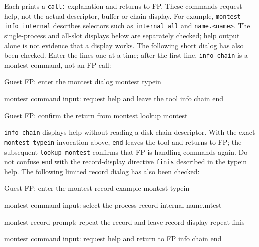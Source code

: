 Each prints a \passthrough{\lstinline!call:!} explanation and returns to FP. These commands request help, not the actual descriptor, buffer or chain display. For example, \passthrough{\lstinline!montest info internal!} describes selectors such as \passthrough{\lstinline!internal all!} and \passthrough{\lstinline!name.<name>!}. The single-process and all-slot displays below are separately checked; help output alone is not evidence that a display works. The following short dialog has also been checked. Enter the lines one at a time; after the first line, \passthrough{\lstinline!info chain!} is a montest command, not an FP call:

\begin{commandexample}{Guest FP: enter the montest dialog}
montest typein
\end{commandexample}

\begin{commandexample}{montest command input: request help and leave the tool}
info chain
end
\end{commandexample}

\begin{commandexample}{Guest FP: confirm the return from montest}
lookup montest
\end{commandexample}

\passthrough{\lstinline!info chain!} displays help without reading a disk-chain descriptor. With the exact \passthrough{\lstinline!montest typein!} invocation above, \passthrough{\lstinline!end!} leaves the tool and returns to FP; the subsequent \passthrough{\lstinline!lookup montest!} confirms that FP is handling commands again. Do not confuse \passthrough{\lstinline!end!} with the record-display directive \passthrough{\lstinline!finis!} described in the typein help. The following limited record dialog has also been checked:

\begin{procedureblock}
\begin{commandexample}{Guest FP: enter the montest record example}
montest typein
\end{commandexample}

\begin{commandexample}{montest command input: select the process record}
internal name.mtest
\end{commandexample}

\begin{commandexample}{montest record prompt: repeat the record and leave record display}
repeat
finis
\end{commandexample}

\begin{commandexample}{montest command input: request help and return to FP}
info chain
end
\end{commandexample}
\end{procedureblock}

